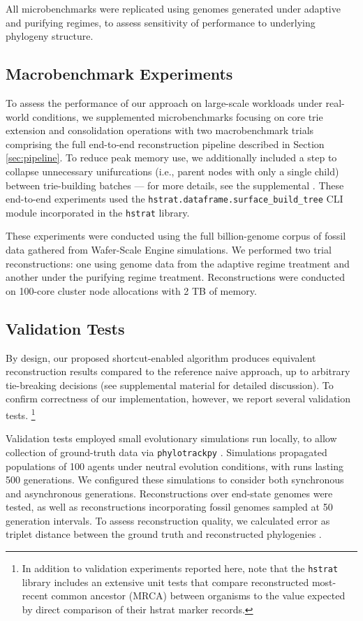 All microbenchmarks were replicated using genomes generated under adaptive and purifying regimes, to assess sensitivity of performance to underlying phylogeny structure.

\subsection{Macrobenchmark Experiments}

To assess the performance of our approach on large-scale workloads under real-world conditions, we supplemented microbenchmarks focusing on core trie extension and consolidation operations with two macrobenchmark trials comprising the full end-to-end reconstruction pipeline described in Section \ref{sec:pipeline}.
To reduce peak memory use, we additionally included a step to collapse unnecessary unifurcations (i.e., parent nodes with only a single child) between trie-building batches --- for more details, see the supplemental \citep{supplemental}.
These end-to-end experiments used the \texttt{hstrat.dataframe.surface\_build\_tree} CLI module incorporated in the \texttt{hstrat} library.

These experiments were conducted using the full billion-genome corpus of fossil data gathered from Wafer-Scale Engine simulations.
We performed two trial reconstructions: one using genome data from the adaptive regime treatment and another under the purifying regime treatment.
Reconstructions were conducted on 100-core cluster node allocations with 2 TB of memory.

\subsection{Validation Tests}

By design, our proposed shortcut-enabled algorithm produces equivalent reconstruction results compared to the reference naive approach, up to arbitrary tie-breaking decisions (see supplemental material \citep{supplemental} for detailed discussion).
To confirm correctness of our implementation, however, we report several validation tests.%
\footnote{In addition to validation experiments reported here, note that the \texttt{hstrat} library includes an extensive unit tests that compare reconstructed most-recent common ancestor (MRCA) between organisms to the value expected by direct comparison of their hstrat marker records.}

Validation tests employed small evolutionary simulations run locally, to allow collection of ground-truth data via \texttt{phylotrackpy} \citep{dolson2024phylotrack}.
Simulations propagated populations of 100 agents under neutral evolution conditions, with runs lasting 500 generations.
We configured these simulations to consider both synchronous and asynchronous generations.
Reconstructions over end-state genomes were tested, as well as reconstructions incorporating fossil genomes sampled at 50 generation intervals.
To assess reconstruction quality, we calculated error as triplet distance between the ground truth and reconstructed phylogenies \citep{critchlow1996triples}.

